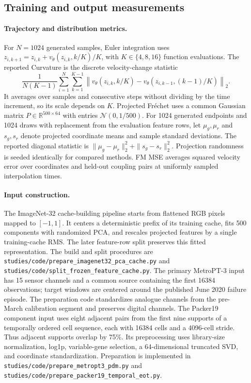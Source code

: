 \subsection{Training and output measurements}
\label{sec:training-output-details}

\paragraph{Trajectory and distribution metrics.}
For $N=1024$ generated samples, Euler integration uses $z_{i,k+1}=z_{i,k}+v_\theta(z_{i,k},k/K)/K$, with $K\in\{4,8,16\}$ function evaluations. The reported Curvature is the discrete velocity-change statistic
\[
\frac{1}{N(K-1)}\sum_{i=1}^{N}\sum_{k=1}^{K-1}
\left\|v_\theta(z_{i,k},k/K)-v_\theta(z_{i,k-1},(k-1)/K)\right\|_2.
\]
It averages over samples and consecutive steps without dividing by the time increment, so its scale depends on $K$.
Projected Fr\'echet uses a common Gaussian matrix $P\in\mathbb R^{500\times64}$ with entries $\mathcal N(0,1/500)$. For 1024 generated endpoints and 1024 draws with replacement from the evaluation feature rows, let $\mu_g,\mu_r$ and $s_g,s_r$ denote projected coordinate means and sample standard deviations. The reported diagonal statistic is $\|\mu_g-\mu_r\|_2^2+\|s_g-s_r\|_2^2$. Projection randomness is seeded identically for compared methods. FM MSE averages squared velocity error over coordinates and held-out coupling pairs at uniformly sampled interpolation times.

\paragraph{Input construction.}
The ImageNet-32 cache-building pipeline starts from flattened RGB pixels mapped to $[-1,1]$. It centers a deterministic prefix of its training cache, fits 500 components with randomized PCA, and rescales projected features by a single training-cache RMS. The later feature-row split preserves this fitted representation. The build and split procedures are \texttt{studies/code/prepare\_imagenet32\_pca\_cache.py} and \texttt{studies/code/split\_frozen\_feature\_cache.py}.
The primary MetroPT-3 input has 15 sensor channels and a common source containing the first 16384 observations; target windows are centered around the published June 2020 failure episode. The preparation code standardizes analogue channels from the pre-March calibration segment and preserves digital channels. The Packer19 component input uses eight adjacent pairs from the first nine supports of a temporally ordered cell sequence, each with 16384 cells and a 4096-cell stride. Thus adjacent supports overlap by 75\%. Its preprocessing uses library-size normalization, log1p, variable-gene selection, a 64-dimensional truncated SVD, and coordinate standardization. Preparation is implemented in \texttt{studies/code/prepare\_metropt3\_pdm.py} and \texttt{studies/code/prepare\_packer19\_temporal\_eot.py}.

